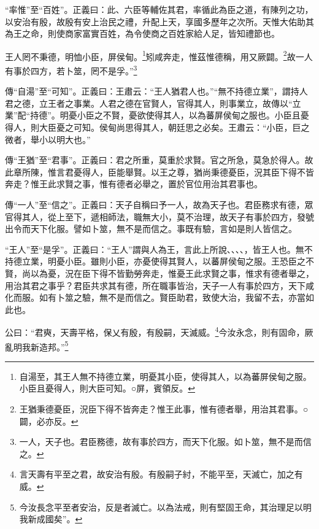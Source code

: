 {\noindent\shu{}\fzkt “率惟”至“百姓”。正義曰：此、六臣等輔佐其君，率循此為臣之道，有陳列之功，以安治有殷，故殷有安上治民之禮，升配上天，享國多歷年之次所。天惟大佑助其為王之命，則使商家富實百姓，為令使商之百姓家給人足，皆知禮節也。 \par}

王人罔不秉德，明恤小臣，屏侯甸。\footnote{自湯至，其王人無不持德立業，明憂其小臣，使得其人，以為蕃屏侯甸之服。小臣且憂得人，則大臣可知。○屏，賓領反。}矧咸奔走，惟茲惟德稱，用又厥闢。\footnote{王猶秉德憂臣，況臣下得不皆奔走？惟王此事，惟有德者舉，用治其君事。○闢，必亦反。}故一人有事於四方，若卜筮，罔不是孚。”\footnote{一人，天子也。君臣務德，故有事於四方，而天下化服。如卜筮，無不是而信之。}


{\noindent\zhuan{}\fzbyks 傳“自湯”至“可知”。正義曰：王肅云：“王人猶君人也。”“無不持德立業”，謂持人君之德，立王者之事業。人君之德在官賢人，官得其人，則事業立，故傳以“立業”配“持德”。明憂小臣之不賢，憂欲使得其人，以為蕃屏侯甸之服也。小臣且憂得人，則大臣憂之可知。侯甸尚思得其人，朝廷思之必矣。王肅云：“小臣，巨之微者，舉小以明大也。” \par}

{\noindent\zhuan{}\fzbyks 傳“王猶”至“君事”。正義曰：君之所重，莫重於求賢。官之所急，莫急於得人。故此章所陳，惟言君憂得人，臣能舉賢。以王之尊，猶尚秉德憂臣，況其臣下得不皆奔走？惟王此求賢之事，惟有德者必舉之，置於官位用治其君事也。 \par}

{\noindent\zhuan{}\fzbyks 傳“一人”至“信之”。正義曰：天子自稱曰予一人，故為天子也。君臣務求有德，眾官得其人，從上至下，遞相師法，職無大小，莫不治理，故天子有事於四方，發號出令而天下化服。譬如卜筮，無不是而信之。事既有驗，言如是則人皆信之。 \par}

{\noindent\shu{}\fzkt “王人”至“是孚”。正義曰：“王人”謂與人為王，言此上所說、、、、，皆王人也。無不持德立業，明憂小臣。雖則小臣，亦憂使得其賢人，以蕃屏侯甸之服。王恐臣之不賢，尚以為憂，況在臣下得不皆勤勞奔走，惟憂王此求賢之事，惟求有德者舉之，用治其君之事乎？君臣共求其有德，所在職事皆治，天子一人有事於四方，天下咸化而服。如有卜筮之驗，無不是而信之。賢臣助君，致使大治，我留不去，亦當如此也。 \par}

公曰：“君奭，天壽平格，保乂有殷，有殷嗣，天滅威。\footnote{言天壽有平至之君，故安治有殷。有殷嗣子紂，不能平至，天滅亡，加之有威。}今汝永念，則有固命，厥亂明我新造邦。”\footnote{今汝長念平至者安治，反是者滅亡。以為法戒，則有堅固王命，其治理足以明我新成國矣”。}


